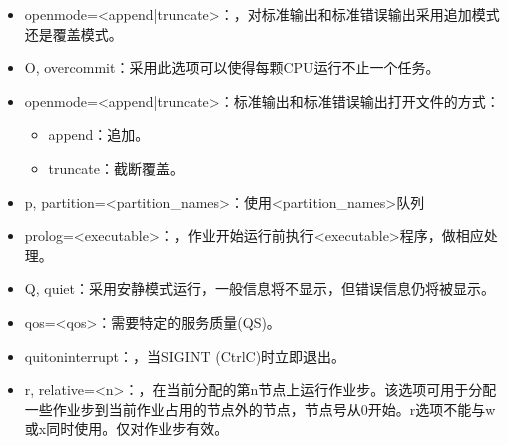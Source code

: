 \documentclass[a4paper,12pt,english]{sphinxmanual}
\begin{document}
\begin{itemize}
\item {} 
\sphinxAtStartPar
\sphinxhyphen{}\sphinxhyphen{}open\sphinxhyphen{}mode=<append|truncate>：，对标准输出和标准错误输出采用追加模式还是覆盖模式。

\item {} 
\sphinxAtStartPar
\sphinxhyphen{}O, \sphinxhyphen{}\sphinxhyphen{}overcommit：采用此选项可以使得每颗CPU运行不止一个任务。

\item {} 
\sphinxAtStartPar
\sphinxhyphen{}\sphinxhyphen{}open\sphinxhyphen{}mode=<append|truncate>：标准输出和标准错误输出打开文件的方式：
\begin{itemize}
\item {} 
\sphinxAtStartPar
append：追加。

\item {} 
\sphinxAtStartPar
truncate：截断覆盖。

\end{itemize}

\item {} 
\sphinxAtStartPar
\sphinxhyphen{}p, \sphinxhyphen{}\sphinxhyphen{}partition=<partition\_names>：使用<partition\_names>队列

\item {} 
\sphinxAtStartPar
\sphinxhyphen{}\sphinxhyphen{}prolog=<executable>：，作业开始运行前执行<executable>程序，做相应处理。

\item {} 
\sphinxAtStartPar
\sphinxhyphen{}Q, \sphinxhyphen{}\sphinxhyphen{}quiet：采用安静模式运行，一般信息将不显示，但错误信息仍将被显示。

\item {} 
\sphinxAtStartPar
\sphinxhyphen{}\sphinxhyphen{}qos=<qos>：需要特定的服务质量(QS)。

\item {} 
\sphinxAtStartPar
\sphinxhyphen{}\sphinxhyphen{}quit\sphinxhyphen{}on\sphinxhyphen{}interrupt：，当SIGINT (Ctrl\sphinxhyphen{}C)时立即退出。

\item {} 
\sphinxAtStartPar
\sphinxhyphen{}r, \sphinxhyphen{}\sphinxhyphen{}relative=<n>：，在当前分配的第n节点上运行作业步。该选项可用于分配一些作业步到当前作业占用的节点外的节点，节点号从0开始。\sphinxhyphen{}r选项不能与\sphinxhyphen{}w或\sphinxhyphen{}x同时使用。仅对作业步有效。


\end{itemize}
\end{document}
